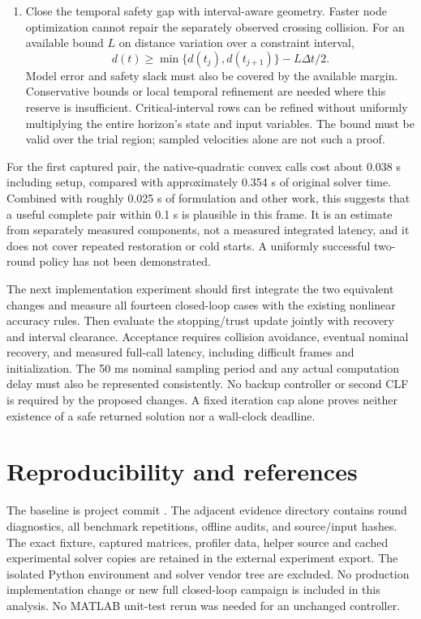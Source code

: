 \documentclass[11pt]{article}
\begin{document}
\begin{enumerate}
of collision feasibility.
\item Close the temporal safety gap with interval-aware geometry. Faster
node optimization cannot repair the separately observed crossing collision.
For an available bound $L$ on distance variation over a constraint interval,
\[
 d(t)\ge\min\{d(t_j),d(t_{j+1})\}-L\Delta t/2.
\]
Model error and safety slack must also be covered by the available margin.
Conservative bounds or local temporal refinement are needed where this reserve
is insufficient. Critical-interval rows can be refined without uniformly
multiplying the entire horizon's state and input variables. The bound must be
valid over the trial region; sampled velocities alone are not such a proof.
\end{enumerate}

For the first captured pair, the native-quadratic convex calls cost about
0.038 s including setup, compared with approximately 0.354 s of original
solver time. Combined with roughly 0.025 s of formulation and other work,
this suggests that a useful complete pair within 0.1 s is plausible in this
frame. It is an estimate from separately measured components, not a measured
integrated latency, and it does not cover repeated restoration or cold starts.
A uniformly successful two-round policy has not been demonstrated.

The next implementation experiment should first integrate the two equivalent
changes and measure all fourteen closed-loop cases with the existing nonlinear
accuracy rules. Then evaluate the stopping/trust update jointly with recovery
and interval clearance. Acceptance requires collision avoidance, eventual
nominal recovery, and measured full-call latency, including difficult frames
and initialization. The 50 ms nominal sampling period and any actual computation
delay must also be represented consistently. No backup controller or second
CLF is required by the proposed changes. A fixed iteration cap alone proves
neither existence of a safe returned solution nor a wall-clock deadline.

\section{Reproducibility and references}
The baseline is project commit
. The adjacent evidence directory
contains round diagnostics, all benchmark repetitions, offline audits, and
source/input hashes. The exact fixture, captured matrices, profiler data,
helper source and cached experimental solver copies are retained in the
external experiment export. The isolated Python environment and solver
vendor tree are excluded. No production implementation change or new full
closed-loop campaign is included in this analysis. No MATLAB unit-test rerun
was needed for an unchanged controller.
\end{document}
